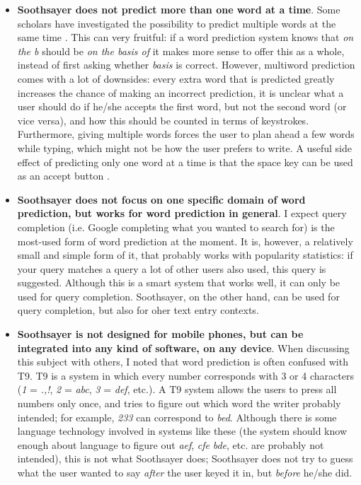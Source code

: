 \documentclass[11pt]{article}
\begin{document}
\begin{itemize}
\item \textbf{Soothsayer does not predict more than one word at a time}. Some scholars have investigated the possibility to predict multiple words at the same time . This can very fruitful: if a word prediction system knows that \emph{on the b} should be \emph{on the basis of} it makes more sense to offer this as a whole, instead of first asking whether \emph{basis} is correct. However, multiword prediction comes with a lot of downsides: every extra word that is predicted greatly increases the chance of making an incorrect prediction, it is unclear what a user should do if he/she accepts the first word, but not the second word (or vice versa), and how this should be counted in terms of keystrokes. Furthermore, giving multiple words forces the user to plan ahead a few words while typing, which might not be how the user prefers to write. A useful side effect of predicting only one word at a time is that the space key can be used as an accept button \cite{Garay-Vitoria+06}.

\item \textbf{Soothsayer does not focus on one specific domain of word prediction, but works for word prediction in general}. I expect query completion (i.e. Google completing what you wanted to search for) is the most-used form of word prediction at the moment. It is, however, a relatively small and simple form of it, that probably works with popularity statistics: if your query matches a query a lot of other users also used, this query is suggested. Although this is a smart system that works well, it can only be used for query completion. Soothsayer, on the other hand, can be used for query completion, but also for oher text entry contexts.

\item \textbf{Soothsayer is not designed for mobile phones, but can be integrated into any kind of software, on any device}. When discussing this subject with others, I noted that word prediction is often confused with T9. T9 is a system in which every number corresponds with 3 or 4 characters (\emph{1} = \emph{.,!}, \emph{2} = \emph{abc}, \emph{3} = \emph{def}, etc.). A T9 system allows the users to press all numbers only once, and tries to figure out which word the writer probably intended; for example, \emph{233} can correspond to \emph{bed}. Although there is some language technology involved in systems like these (the system should know enough about language to figure out \emph{aef}, \emph{cfe} \emph{bde}, etc. are probably not intended), this is not what Soothsayer does; Soothsayer does not try to guess what the user wanted to say \emph{after} the user keyed it in, but \emph{before} he/she did. 


\end{itemize}
\end{document}
